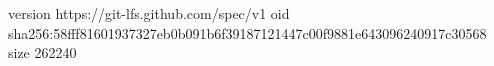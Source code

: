 version https://git-lfs.github.com/spec/v1
oid sha256:58fff81601937327eb0b091b6f39187121447c00f9881e643096240917c30568
size 262240
